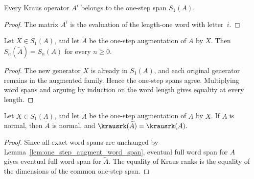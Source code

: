 \begin{lemma}\label{lem:kraus_mem_word_span_one}
    \leanok
    Every Kraus operator $A^i$ belongs to the one-step span $S_1(A)$.
\end{lemma}

\begin{proof}
    \leanok
    The matrix $A^i$ is the evaluation of the length-one word with letter~$i$.
\end{proof}

\begin{lemma}\label{lem:one_step_augment_word_span}
    \leanok
    Let $X\in S_1(A)$, and let $\widetilde A$ be the one-step
    augmentation of $A$ by $X$. Then
    $S_n(\widetilde A)=S_n(A)$ for every $n\ge0$.
\end{lemma}

\begin{proof}
    \leanok
    The new generator $X$ is already in $S_1(A)$, and each original
    generator remains in the augmented family. Hence the one-step spans
    agree. Multiplying word spans and arguing by induction on the word
    length gives equality at every length.
\end{proof}

\begin{lemma}%
    \label{lem:one_step_augment_normal_kraus_rank}
    \leanok
    Let $X\in S_1(A)$, and let $\widetilde A$ be the one-step augmentation
    of $A$ by $X$. If $A$ is normal, then $\widetilde A$ is normal, and
    $\krausrk(\widetilde A)=\krausrk(A)$.
\end{lemma}

\begin{proof}
    \leanok
    Since all exact word spans are unchanged by
    Lemma~\ref{lem:one_step_augment_word_span}, eventual full word span
    for $A$ gives eventual full word span for $\widetilde A$.
    The equality of Kraus ranks is the equality of the dimensions of the
    common one-step span.
\end{proof}

